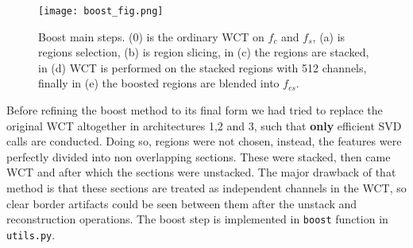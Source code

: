 \begin{figure}[h!]
	\centering
	\texttt{[image: boost\_fig.png]}
	\caption{Boost main steps. (0) is the ordinary WCT on $f_c$ and $f_s$, (a) is regions selection, (b) is region slicing, in (c) the regions are stacked, in (d) WCT is performed on the stacked regions with 512 channels, finally in (e) the boosted regions are blended into $f_{cs}$.}
	\label{fig:boost}
\end{figure}

Before refining the boost method to its final form we had tried to replace the original WCT altogether in architectures 1,2 and 3, such that \textbf{only} efficient SVD calls are conducted. Doing so, regions were not chosen, instead, the features were perfectly divided into non overlapping sections. These were stacked, then came WCT and after which the sections were unstacked. The major drawback of that method is that these sections are treated as independent channels in the WCT, so clear border artifacts could be seen between them after the unstack and reconstruction operations. The boost step is implemented in \texttt{boost} function in \texttt{utils.py}.

